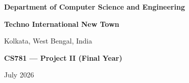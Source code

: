 \begin{titlepage}
    \vspace{1.2cm}

    {\large\bfseries Department of Computer Science and Engineering\par}
    \vspace{0.3cm}
    {\large\bfseries Techno International New Town\par}
    \vspace{0.3cm}
    {\large Kolkata, West Bengal, India\par}

    \vspace{1cm}
    {\large\bfseries CS781 --- Project II (Final Year)\par}
    \vspace{0.3cm}
    {\large July 2026\par}

\end{titlepage}
